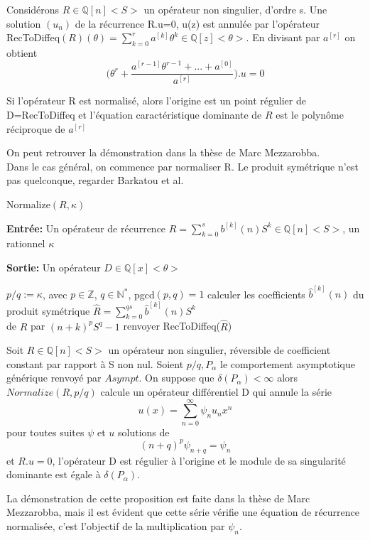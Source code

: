 \documentclass[a4paper,10.5pt]{article}
\begin{document}
	Considérons $R \in \mathbb{Q}[n]\big< S\big>$ un opérateur non singulier, d'ordre s. Une solution $(u_{n})$ de la récurrence R.u=0, u(z) est annulée par l'opérateur RecToDiffeq$(R)(\theta)=\sum_{k=0}^{r}a^{[k]}\theta^{k} \in \mathbb{Q}[z]\big< \theta\big>$. En divisant par $a^{[r]}$ on obtient
	\begin{equation}
	\big(\theta^{r}+\frac{a^{[r-1]}\theta^{r-1}+...+a^{[0]}}{a^{[r]}}\big).u=0
	\end{equation}

	
	\begin{proposition}Si l'opérateur R est normalisé, alors l'origine est un point régulier de D=RecToDiffeq et l'équation caractéristique dominante de $R$ est le polynôme réciproque de $a^{[r]}$ 
	\end{proposition}
	On peut retrouver la démonstration dans la thèse de Marc Mezzarobba.\\
	
	Dans le cas général, on commence par normaliser R.
	Le produit symétrique n'est pas quelconque, regarder Barkatou et al.
	\newpage
	\begin{algorithm}
		\caption{Normalize$(R,\kappa)$}
		
		\vspace{2mm}
		
		\textbf{Entrée:} Un opérateur de récurrence $R=\sum_{k=0}^{s} b^{[k]}(n)S^{k} \in \mathbb{Q}[n]\big<S\big>$, un rationnel $\kappa$
		
		\textbf{Sortie:} Un opérateur $D \in \mathbb{Q}[x] \big<\theta\big>$ 
		
		\begin{algorithmic}[1]
			\vspace{4mm}
			\STATE $p/q:=\kappa$, avec $p \in \mathbb{Z}$, $q \in \mathbb{N}^{*}$, pgcd$(p,q)=1$
			\vspace{4mm}
			\STATE calculer les coefficients $\hat{b}^{[k]}(n)$ du produit symétrique $\hat{R}=\sum_{k=0}^{qs}\hat{b}^{[k]}(n)S^{k}$\\
			\vspace{2mm}
			de $R$ par $(n+k)^{p}S^{q}-1$
			\vspace{4mm}
			\STATE renvoyer RecToDiffeq($\hat{R}$)
		\end{algorithmic}
	\end{algorithm}

	\begin{proposition}Soit $R \in \mathbb{Q}[n]\big< S\big>$ un opérateur non singulier, réversible de coefficient constant par rapport à S non nul. Soient $p/q, P_{\alpha}$ le comportement asymptotique générique renvoyé par $Asympt$. On suppose que $\delta(P_{\alpha})<\infty$ alors $Normalize(R,p/q)$ calcule un opérateur différentiel D qui annule la série 
		\[u(x)=\sum_{n=0}^{\infty} \psi_{n}u_{n}x^{n}\]
		pour toutes suites $\psi$ et $u$ solutions de
		\[(n+q)^{p}\psi_{n+q}=\psi_{n}\]
		et $R.u=0$, l'opérateur D est régulier à l'origine et le module de sa singularité dominante est égale à $\delta(P_{\alpha})$.
	\end{proposition}
	La démonstration de cette proposition est faite dans la thèse de Marc Mezzarobba, mais il est évident que cette série vérifie une équation de récurrence normalisée, c'est l'objectif de la multiplication par $\psi_n$.
	
\end{document}
